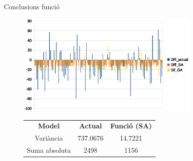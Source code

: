\documentclass[twocolumn]{beamer}
\begin{document}
\begin{frame}{Conclusions funció}
\begin{figure}
	\includegraphics[width=9cm]{saldo_diff_ga}
	\begin{tabular}{c|c|c}
		\textbf{Model} & \textbf{Actual} & \textbf{Funció (SA)} \\
		Variància & 737.0676 & 14.7221 \\
		Suma absoluta & 2498 & 1156 \\
	\end{tabular}
\end{figure}
\end{frame}
\end{document}
